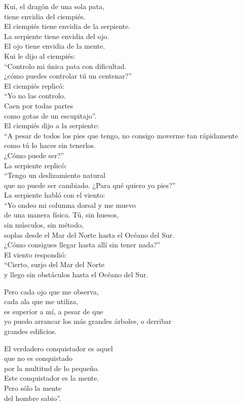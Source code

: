 \documentclass[hidelinks]{memoir}
\begin{document}
	Kui, el dragón de una sola pata,\\
	tiene envidia del ciempiés.\\
	El ciempiés tiene envidia de la serpiente.\\
	La serpiente tiene envidia del ojo.\\
	El ojo tiene envidia de la mente.\\
	Kui le dijo al ciempiés:\\
	``Controlo mi única pata con dificultad.\\
	¿cómo puedes controlar tú un centenar?''\\
	El ciempiés replicó:\\
	``Yo no las controlo.\\
	Caen por todas partes\\
	como gotas de un escupitajo''.\\
	El ciempiés dijo a la serpiente:\\
	``A pesar de todos los pies que tengo, no consigo moverme tan
	rápidamente\\
	como tú lo haces sin tenerlos.\\
	¿Cómo puede ser?''\\
	La serpiente replicó:\\
	``Tengo un deslizamiento natural\\
	que no puede ser cambiado. ¿Para qué quiero yo pies?''\\
	La serpiente habló con el viento:\\
	``Yo ondeo mi columna dorsal y me muevo\\
	de una manera física. Tú, sin huesos,\\
	sin músculos, sin método,\\
	soplas desde el Mar del Norte hasta el Océano del Sur.\\
	¿Cómo consigues llegar hasta allí sin tener nada?''\\
	El viento respondió:\\
	``Cierto, surjo del Mar del Norte\\
	y llego sin obstáculos hasta el Océano del Sur.
	
	Pero cada ojo que me observa,\\
	cada ala que me utiliza,\\
	es superior a mí, a pesar de que\\
	yo puedo arrancar los más grandes árboles, o derribar\\
	grandes edificios.
	
	El verdadero conquistador es aquel\\
	que no es conquistado\\
	por la multitud de lo pequeño.\\
	Este conquistador es la mente.\\
	Pero sólo la mente\\
	del hombre sabio''.
	
\end{document}
